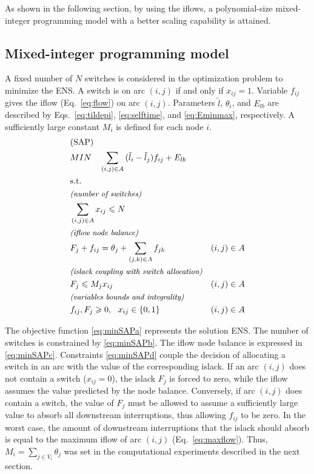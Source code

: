 \documentclass{article}
\begin{document}
As shown in the following section, by
using the iflows, a polynomial-size mixed-integer programming model with a better scaling capability is attained.



\subsection{Mixed-integer programming model} \label{sec:model}

A fixed number of $N$ switches is considered in the optimization problem to minimize the ENS.
A switch is on arc $(i,j)$ if and only if $x_{ij} = 1$. Variable $f_{ij}$ gives the iflow (Eq.~\ref{eq:flow}) on arc $(i,j)$. Parameters $\tilde{l}$, $\theta_i$, and $E_{lb}$ are described by Eqs.~\eqref{eq:tildepi}, \eqref{eq:selftime}, and \eqref{eq:Eminmax}, respectively. A sufficiently large constant $M_i$ is defined for each node $i$. 
\begin{align}
	& \mbox{(SAP)} & \notag \\
	& MIN \quad \sum_{(i,j) \in A}{(\tilde{l}_i-\tilde{l}_j)f_{ij}}+E_{lb} \label{eq:minSAPa}  \\
	& \mbox{s.t.} & \notag \\
	& \mbox{\textit{\small (number of switches)}} & \notag \\
 	& \sum_{(i,j) \in A}{x_{ij}} \leqslant N & \label{eq:minSAPb}  \\
	& \mbox{\textit{\small (iflow node balance)}} & \notag \\
	& \displaystyle F_j + f_{ij} = \theta_j + \sum_{(j,k) \in A}{f_{jk}} & (i,j) \in A \label{eq:minSAPc} \\
    & \mbox{\textit{\small (islack coupling with switch allocation)}} & \notag \\
    & \displaystyle F_j \leqslant M_jx_{ij} & (i,j) \in A \label{eq:minSAPd} \\
	& \mbox{\textit{\small (variables bounds and integrality)}} & \notag \\
	& f_{ij}, F_{j} \geqslant 0, \ \ x_{ij} \in \left\{0,1\right\} & (i,j) \in A \label{eq:domain1} %
\end{align}

The objective function \eqref{eq:minSAPa} represents the solution ENS. The number of switches is constrained by \eqref{eq:minSAPb}. The iflow node balance is expressed in \eqref{eq:minSAPc}. Constraints \eqref{eq:minSAPd} couple the decision of allocating a switch in an arc with the value of the corresponding islack. If an arc $(i,j)$ does not contain a switch ($x_{ij} = 0$), the islack $F_j$ is forced to zero, while the iflow assumes the value predicted by the node balance. Conversely, if arc $(i,j)$ does contain a switch, the value of $F_j$ must be allowed to assume a sufficiently large value to absorb all downstream interruptions, thus allowing $f_{ij}$ to be zero. In the worst case, the amount of downstream interruptions that the islack should absorb is equal to the maximum iflow of arc $(i,j)$ (Eq.~\eqref{eq:maxflow}). Thus, $\displaystyle M_i = \sum_{j \in V_i}{\theta_j}$ was set in the computational experiments described in the next section.
\end{document}

